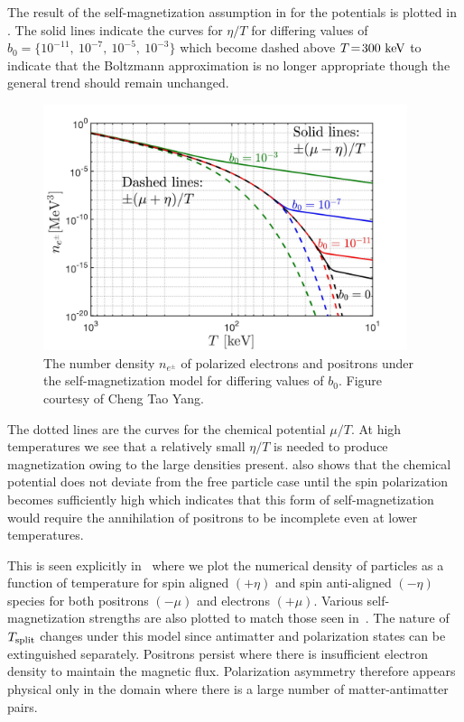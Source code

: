 The result of the self-magnetization assumption in  for the potentials is plotted in . The solid lines indicate the curves for $\eta/T$ for differing values of $b_{0}=\{10^{-11},\ 10^{-7},\ 10^{-5},\ 10^{-3}\}$ which become dashed above $T\!=\!300\text{ keV}$ to indicate that the Boltzmann approximation is no longer appropriate though the general trend should remain unchanged.

\begin{figure}[ht]
 \centering
 \includegraphics[width=0.95\textwidth]{plots/chap04cosmo/ElectronDensity_SpinChemicalPotential004.jpg}
 \caption{The number density $n_{e^{\pm}}$ of polarized electrons and positrons under the self-magnetization model for differing values of $b_{0}$. Figure courtesy of Cheng Tao Yang.}
 \label{fig:polarswap} 
\end{figure}

The dotted lines are the curves for the chemical potential $\mu/T$. At high temperatures we see that a relatively small $\eta/T$ is needed to produce magnetization owing to the large densities present.  also shows that the chemical potential does not deviate from the free particle case until the spin polarization becomes sufficiently high which indicates that this form of self-magnetization would require the annihilation of positrons to be incomplete even at lower temperatures.

This is seen explicitly in~ where we plot the numerical density of particles as a function of temperature for spin aligned $(+\eta)$ and spin anti-aligned $(-\eta)$ species for both positrons $(-\mu)$ and electrons $(+\mu)$. Various self-magnetization strengths are also plotted to match those seen in~. The nature of $T_{\rm split}$ changes under this model since antimatter and polarization states can be extinguished separately. Positrons persist where there is insufficient electron density to maintain the magnetic flux. Polarization asymmetry therefore appears physical only in the domain where there is a large number of matter-antimatter pairs.

